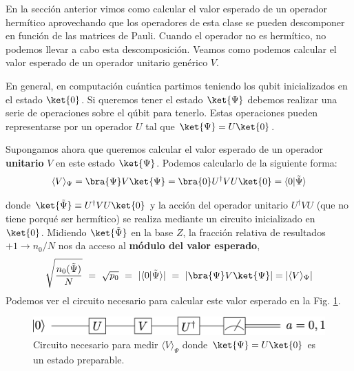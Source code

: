 \documentclass[a4paper,11pt]{book} %
\numberwithin{equation}{chapter}
\newcommand{\braket}[2]{\langle #1|#2\rangle}
\begin{document}
En la sección anterior vimos como calcular el valor esperado de un operador hermítico aprovechando que los operadores de esta clase se pueden descomponer en función de las matrices de Pauli. Cuando el operador no es hermítico, no podemos llevar a cabo esta descomposición. Veamos como podemos calcular el valor esperado de un operador unitario genérico $V$.

En general, en computación cuántica partimos teniendo los qubit inicializados en el estado $\ket{0}$. Si queremos tener el estado $\ket{\Psi}$ debemos realizar una serie de operaciones sobre el qúbit para tenerlo. Estas operaciones pueden representarse por un operador  $U$ tal que $\ket{\Psi} = U\ket{0}$. 

Supongamos ahora que queremos calcular el valor esperado de un operador \textbf{unitario} $V$ en este estado $\ket{\Psi}$. Podemos calcularlo de la siguiente forma:
\begin{equation}
\langle V \rangle_\Psi = \bra{\Psi}V\ket{\Psi} = \bra{0} U^\dagger V U\ket{0} = \braket{0}{\tilde \Psi}
\end{equation}

donde $\ket{\tilde\Psi} \equiv U^\dagger V U\ket{0}$ y la acción del operador unitario $U^\dagger V U$ (que no tiene porqué ser hermítico) se realiza mediante un circuito inicializado en $\ket{0}$.  Midiendo $\ket{\tilde \Psi}$  en la base $Z$, la fracción relativa de resultados $+1\to  n_0/N$ nos da acceso al \textbf{módulo del valor esperado}, 
\begin{equation}
\sqrt{ \frac{n_{0}(\tilde\Psi)}{N} } ~=~  \sqrt{p_0}  ~=~   | \braket{0}{\tilde \Psi}|  ~=~ |\bra{\Psi}V\ket{\Psi}|    = |\langle V \rangle_\Psi |
\end{equation}
Podemos ver el circuito necesario para calcular este valor esperado en la Fig. \ref{Fig_medidad1_vev_unitary_V}.
	\begin{figure}[H]
	\centering 
	\includegraphics[width=0.6\linewidth]{Figuras/Fig_medidas1_vev_unitary_V.png}
	\caption{Circuito necesario para medir $\langle V\rangle_{\Psi} $ donde $\ket{\Psi} = U\ket{0}$ es un estado preparable.}
	\label{Fig_medidad1_vev_unitary_V}
	\end{figure}
\end{document}
